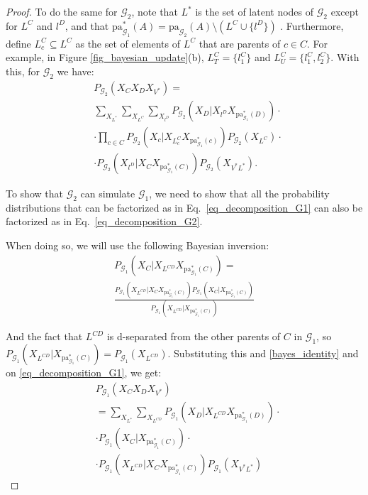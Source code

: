 \begin{proof}
    To do the same for $\mathcal{G}_2$, note that $L^*$ is the set of latent nodes of $\mathcal{G}_2$ except for $L^C$ and $l^D$, and that $\text{pa}^*_{\mathcal{G}_1}(A)=\text{pa}_{\mathcal{G}_2}(A)\setminus (L^{C}\cup\{l^D\})$ . Furthermore, define  $L^{C}_c\subseteq L^{C}$ as the set of elements of $L^C$ that are parents of $c\in C$. For example, in Figure \ref{fig_bayesian_update}(b), $L^{C}_T=\{l_1^C\}$ and $L^{C}_U=\{l_1^C,l_2^C\}$. With this, for $\mathcal{G}_2$ we have:
    \begin{align}
    &P_{\mathcal{G}_2}(X_C X_D X_{V^*}) = \nonumber \\& \sum_{X_{L^*}} \sum_{X_{L^{C}}} \sum_{X_{l^D}} {P_{\mathcal{G}_2}(X_D|X_{l^{D}}X_{\text{pa}^*_{\mathcal{G}_1}(D)})}\cdot \nonumber \\& \cdot\prod_{c\in C} P_{\mathcal{G}_2}(X_c|X_{L^{C}_c}X_{\text{pa}^*_{\mathcal{G}_1}(c)})P_{\mathcal{G}_2}(X_{L^{C}})\cdot \nonumber\\
    & \cdot P_{\mathcal{G}_2}(X_{l^{D}}|X_CX_{\text{pa}^*_{\mathcal{G}_1}(C)})P_{\mathcal{G}_2}(X_{V^*L^*}).
    \label{eq_decomposition_G2}
    \end{align}

    To show that $\mathcal{G}_2$ can simulate $\mathcal{G}_1$, we need to show that all the probability distributions that can be factorized as in Eq.~\eqref{eq_decomposition_G1} can also be factorized as in Eq.~\eqref{eq_decomposition_G2}. 

    When doing so, we will use the following Bayesian inversion:
    \begin{gather}
        P_{\mathcal{G}_1}(X_C|X_{L^{CD}}X_{\text{pa}^*_{\mathcal{G}_1}(C)})=\nonumber \\ 
        \frac{ P_{\mathcal{G}_1}(X_{L^{CD}}|X_CX_{\text{pa}^*_{\mathcal{G}_1}(C)})P_{\mathcal{G}_1}(X_C|X_{\text{pa}^*_{\mathcal{G}_1}(C)})}{P_{\mathcal{G}_1}(X_{L^{CD}}|X_{\text{pa}^*_{\mathcal{G}_1}(C)})} 
                \label{bayes_identity}
    \end{gather}

    And the fact that $L^{CD}$ is d-separated from the other parents of $C$ in $\mathcal{G}_1$, so $P_{\mathcal{G}_1}(X_{L^{CD}}|X_{\text{pa}^*_{\mathcal{G}_1}(C)})=P_{\mathcal{G}_1}(X_{L^{CD}})$. Substituting this and \eqref{bayes_identity} and on \eqref{eq_decomposition_G1}, we get:
    \begin{align}
    	 & P_{\mathcal{G}_1}(X_C X_D X_{V^*}) \nonumber \\ &=\sum_{X_{L^*}}\sum_{X_{L^{CD}}} P_{\mathcal{G}_1}(X_D|X_{L^{CD}}X_{\text{pa}^*_{\mathcal{G}_1}(D)}) \cdot \nonumber\\
    	&\cdot P_{\mathcal{G}_1}(X_C|X_{\text{pa}^*_{\mathcal{G}_1}(C)})\cdot \nonumber \\ &\cdot P_{\mathcal{G}_1}(X_{L^{CD}}|X_C X_{\text{pa}^*_{\mathcal{G}_1}(C)})P_{\mathcal{G}_1}(X_{V^*L^*}) 
    \label{eq_decomposition_G1_two}
    \end{align}


\end{proof}
